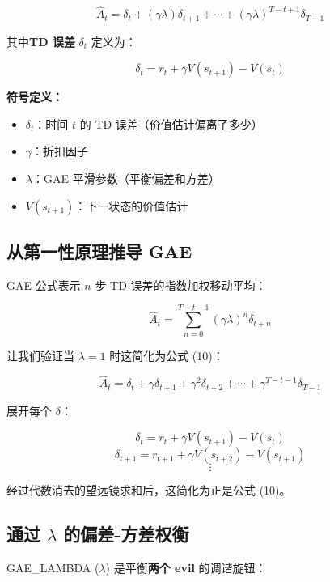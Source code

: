 \documentclass[12pt,a4paper]{article}
\theoremstyle{noteplain}
\theoremstyle{noteexercise}
\begin{document}
\begin{equation}\label{eq:gae}
  \hat{A}_t = \delta_t + (\gamma\lambda)\delta_{t+1} + \cdots + (\gamma\lambda)^{T-t+1}\delta_{T-1}
\end{equation}

其中\textbf{TD 误差} $\delta_t$ 定义为：

\begin{equation}\label{eq:td-error}
  \delta_t = r_t + \gamma V(s_{t+1}) - V(s_t)
\end{equation}

\textbf{符号定义：}
\begin{itemize}
  \setlength{\itemsep}{0.2em}
  \item $\delta_t$：时间 $t$ 的 TD 误差（价值估计偏离了多少）
  \item $\gamma$：折扣因子
  \item $\lambda$：GAE 平滑参数（平衡偏差和方差）
  \item $V(s_{t+1})$：下一状态的价值估计
\end{itemize}

\subsection{从第一性原理推导 GAE}

GAE 公式表示 $n$ 步 TD 误差的指数加权移动平均：

\begin{equation}\label{eq:gae-sum}
  \hat{A}_t = \sum_{n=0}^{T-t-1} (\gamma\lambda)^n \delta_{t+n}
\end{equation}

让我们验证当 $\lambda = 1$ 时这简化为公式 (10)：

\begin{equation}\label{eq:gae-lambda-1}
  \hat{A}_t = \delta_t + \gamma\delta_{t+1} + \gamma^2\delta_{t+2} + \cdots + \gamma^{T-t-1}\delta_{T-1}
\end{equation}

展开每个 $\delta$：

$$\delta_t = r_t + \gamma V(s_{t+1}) - V(s_t)$$
$$\delta_{t+1} = r_{t+1} + \gamma V(s_{t+2}) - V(s_{t+1})$$
$$\vdots$$

经过代数消去的望远镜求和后，这简化为正是公式 (10)。

\subsection{通过 $\lambda$ 的偏差-方差权衡}

GAE\_LAMBDA ($\lambda$) 是平衡\textbf{两个 evil} 的调谐旋钮：
\end{document}
